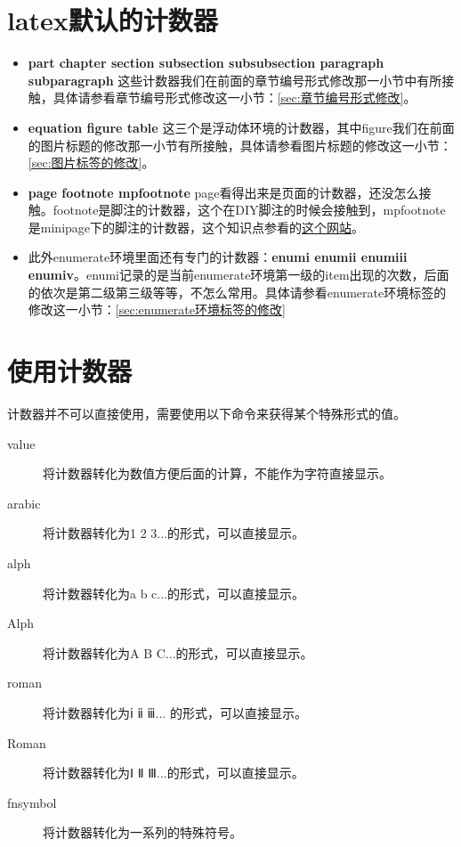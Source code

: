\documentclass[11pt,oneside]{book}
\begin{document}
\section{latex默认的计数器}
\begin{itemize}
\item \textbf{part chapter section subsection subsubsection paragraph \linebreak subparagraph} 这些计数器我们在前面的章节编号形式修改那一小节中有所接触，具体请参看章节编号形式修改这一小节：\ref{sec:章节编号形式修改}。
\item \textbf{equation figure table} 这三个是浮动体环境的计数器，其中figure我们在前面的图片标题的修改那一小节有所接触，具体请参看图片标题的修改这一小节：\ref{sec:图片标签的修改}。
\item \textbf{page footnote mpfootnote} page看得出来是页面的计数器，还没怎么接触。footnote是脚注的计数器，这个在DIY脚注的时候会接触到，mpfootnote是minipage下的脚注的计数器，这个知识点参看的\href{http://tex.stackexchange.com/questions/18499/how-to-change-symbol-for-footnote-in-minipage}{这个网站}。
\item 此外enumerate环境里面还有专门的计数器：\textbf{enumi enumii enumiii enumiv}。enumi记录的是当前enumerate环境第一级的item出现的次数，后面的依次是第二级第三级等等，不怎么常用。具体请参看enumerate环境标签的修改这一小节：\ref{sec:enumerate环境标签的修改}
\end{itemize}



\section{使用计数器}
计数器并不可以直接使用，需要使用以下命令来获得某个特殊形式的值。
\begin{description}
\item[value] 将计数器转化为数值方便后面的计算，不能作为字符直接显示。
\item[arabic] 将计数器转化为1 2 3...的形式，可以直接显示。
\item[alph] 将计数器转化为a b c...的形式，可以直接显示。
\item[Alph] 将计数器转化为A B C...的形式，可以直接显示。
\item[roman] 将计数器转化为ⅰ ⅱ ⅲ... 的形式，可以直接显示。
\item[Roman] 将计数器转化为Ⅰ Ⅱ Ⅲ...的形式，可以直接显示。
\item[fnsymbol] 将计数器转化为一系列的特殊符号。
\end{description}
\end{document}
